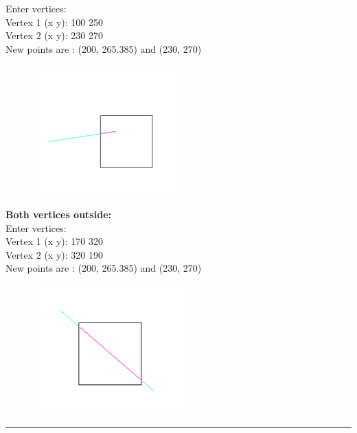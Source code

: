 \documentclass[9pt,letterpaper]{article}
\begin{document}
Enter vertices:  \\
Vertex 1 (x y): 100 250 \\
Vertex 2 (x y): 230 270 \\
New points are : (200, 265.385) and (230, 270) \\


\begin{figure}[h]
    \centering
    \includegraphics[height=5cm]{Outputs/OP4.png}
\end{figure}

\newpage
\textbf{\large{Both vertices outside: }}\\

Enter vertices:  \\
Vertex 1 (x y): 170 320 \\
Vertex 2 (x y): 320 190 \\
New points are : (200, 265.385) and (230, 270) \\


\begin{figure}[h]
    \centering
    \includegraphics[height=5cm]{Outputs/OP5.png}
\end{figure}

\bigskip\bigskip
\hrule
\end{document}
